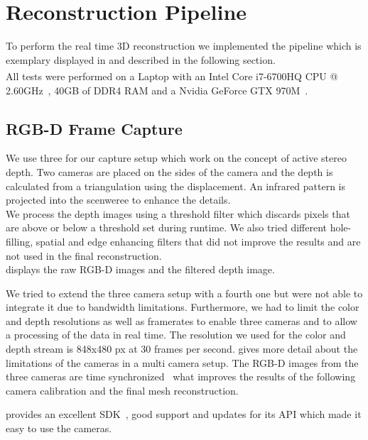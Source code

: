 \documentclass[10pt,twocolumn,letterpaper]{article}
\begin{document}
\section{Reconstruction Pipeline}
\label{sec:reconstruction-pipeline}
To perform the real time 3D reconstruction we implemented the pipeline which is exemplary displayed in  and described in the following section.\\
All tests were performed on a Laptop with an Intel\textsuperscript{\textregistered} Core\texttrademark{} \mbox{i7-6700HQ} CPU @ 2.60GHz~\cite{CPU}, 40GB of DDR4 RAM and a Nvidia GeForce GTX 970M~\cite{GTX970}.

\subsection{RGB-D Frame Capture}
We use three \rscamera{} for our capture setup which work on the concept of active stereo depth. Two cameras are placed on the sides of the camera and the depth is calculated from a triangulation using the displacement. An infrared pattern is projected into the scenweree to enhance the details.\\
We process the depth images using a threshold filter which discards pixels that are above or below a threshold set during runtime. We also tried different hole-filling, spatial and edge enhancing filters that did not improve the results and are not used in the final reconstruction.\\
 displays the raw RGB-D images and the filtered depth image.

We tried to extend the three camera setup with a fourth one but were not able to integrate it due to bandwidth limitations. Furthermore, we had to limit the color and depth resolutions as well as framerates to enable three cameras and to allow a processing of the data in real time. The resolution we used for the color and depth stream is 848x480 px at 30 frames per second. \cite{RealSenseWhitepaper} gives more detail about the limitations of the cameras in a multi camera setup.
\newpage
The RGB-D images from the three cameras are time synchronized~\cite{RealSenseWhitepaper} what improves the results of the following camera calibration and the final mesh reconstruction.

\intel{} provides an excellent SDK~\cite{RealSenseSDK}, good support and updates for its API which made it easy to use the cameras.
\end{document}

